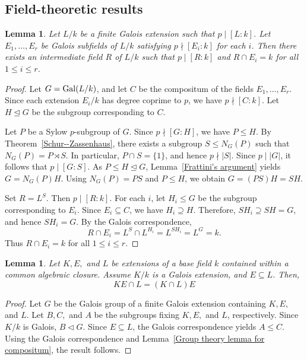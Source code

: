 \documentclass[10pt]{amsart}
\theoremstyle{plain}
\newtheorem{lemma}[thm]{Lemma}
\theoremstyle{definition}
\newcommand{\Gal}{{\rm Gal}}
\begin{document}
\subsection{Field-theoretic results}

\begin{lemma}\label{field-theory lemma}
Let \(L/k\) be a finite Galois extension such that \(p\mid [L:k]\). Let
\(E_1,\dots,E_r\) be Galois subfields of \(L/k\) satisfying
\(p\nmid [E_i:k]\) for each \(i\). Then there exists an intermediate field
\(R\) of \(L/k\) such that \(p\mid [R:k]\) and \(R\cap E_i=k\) for all
\(1\le i\le r\).
\end{lemma}

\begin{proof}
Let \(G=\Gal(L/k)\), and let \(C\) be the compositum of the fields
\(E_1,\dots,E_r\). Since each extension \(E_i/k\) has degree coprime to \(p\),
we have \(p\nmid [C:k]\). Let \(H\trianglelefteq G\) be the subgroup corresponding to \(C\).

Let \(P\) be a Sylow \(p\)-subgroup of \(G\). Since \(p\nmid [G:H]\), we have
\(P\le H\). By Theorem~\ref{Schur--Zassenhaus}, there exists a subgroup
\(S\le N_G(P)\) such that \(N_G(P)=P\rtimes S\). In particular, \(P\cap S=\{1\}\), and hence
\(p\nmid |S|\). Since \(p\mid |G|\), it follows that \(p\mid [G:S]\). As \(P\le H\trianglelefteq G\), Lemma~\ref{Frattini's argument} yields
\(G=N_G(P)H\). Using \(N_G(P)=PS\) and \(P\le H\), we obtain \(G=(PS)H=SH\).

Set \(R=L^S\). Then \(p\mid [R:k]\). For each \(i\), let \(H_i\le G\) be the
subgroup corresponding to \(E_i\). Since \(E_i\subseteq C\), we have
\(H_i\supseteq H\). Therefore,
\(SH_i\supseteq SH=G\), and hence \(SH_i=G\). By the Galois correspondence,
$$
R\cap E_i
=
L^S\cap L^{H_i}
=
L^{SH_i}
=
L^G
=
k.
$$
Thus \(R\cap E_i=k\) for all \(1 \le i \le r\).
\end{proof}




\begin{lemma}\label{Field theory lemma for compositum}
    Let $K, E,$ and $L$ be extensions of a base field $k$ contained within a common algebraic closure. Assume $K/k$ is a Galois extension, and $E \subseteq L$. Then,$$KE \cap L = (K \cap L)E$$
\end{lemma}
\begin{proof}
    Let $G$ be the Galois group of a finite Galois extension containing $K, E,$ and $L$. Let $B, C,$ and $A$ be the subgroups fixing $K, E,$ and $L$, respectively. Since $K/k$ is Galois, $B \triangleleft G$. Since $E \subseteq L$, the Galois correspondence yields $A \leq C$. Using the Galois correspondence and Lemma~\ref{Group theory lemma for compositum}, the result follows.
\end{proof}
\end{document}
